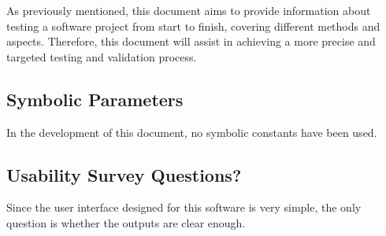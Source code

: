 \documentclass[12pt, titlepage]{article}
\begin{document}
As previously mentioned, this document aims to provide information about testing a software project from start to finish, covering different methods and aspects. Therefore, this document will assist in achieving a more precise and targeted testing and validation process.

\subsection{Symbolic Parameters}

In the development of this document, no symbolic constants have been used.
\subsection{Usability Survey Questions?}

Since the user interface designed for this software is very simple, the only question is whether the outputs are clear enough.

\newpage{}
\end{document}
